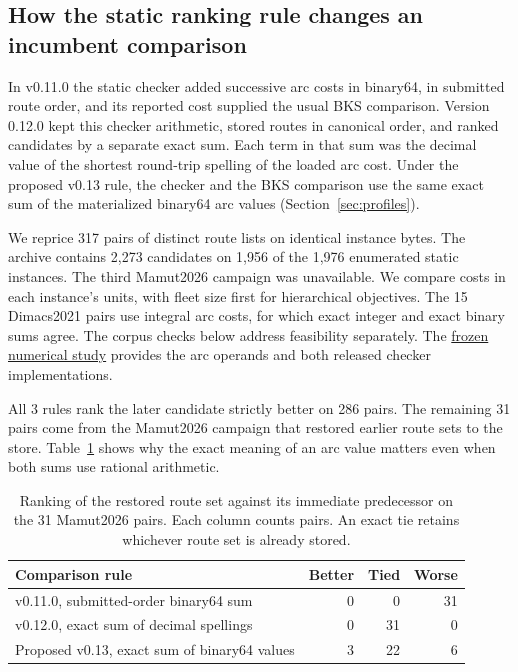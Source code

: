\subsection{How the static ranking rule changes an incumbent comparison}\label{app:static-history}

In v0.11.0 the static checker added successive arc costs in binary64, in submitted route order, and its reported cost supplied the usual BKS comparison. Version 0.12.0 kept this checker arithmetic, stored routes in canonical order, and ranked candidates by a separate exact sum. Each term in that sum was the decimal value of the shortest round-trip spelling of the loaded arc cost. Under the proposed v0.13 rule, the checker and the BKS comparison use the same exact sum of the materialized binary64 arc values (Section~\ref{sec:profiles}).

We reprice 317 pairs of distinct route lists on identical instance bytes. The archive contains 2,273 candidates on 1,956 of the 1,976 enumerated static instances. The third Mamut2026 campaign was unavailable. We compare costs in each instance's units, with fleet size first for hierarchical objectives. The 15 Dimacs2021 pairs use integral arc costs, for which exact integer and exact binary sums agree. The corpus checks below address feasibility separately. The \href{https://github.com/0nyr/routing-numerical-contracts/tree/75905c8827f959621ea808894e28136d248d2d15}{frozen numerical study} provides the arc operands and both released checker implementations.

All 3 rules rank the later candidate strictly better on 286 pairs. The remaining 31 pairs come from the Mamut2026 campaign that restored earlier route sets to the store. Table~\ref{tab:static-history} shows why the exact meaning of an arc value matters even when both sums use rational arithmetic.

\begin{table}[htbp]
\centering
\small
\begin{tabular}{@{}lrrr@{}}
\toprule
Comparison rule & Better & Tied & Worse\\
\midrule
v0.11.0, submitted-order binary64 sum & 0 & 0 & 31\\
v0.12.0, exact sum of decimal spellings & 0 & 31 & 0\\
Proposed v0.13, exact sum of binary64 values & 3 & 22 & 6\\
\bottomrule
\end{tabular}
\caption{Ranking of the restored route set against its immediate predecessor on the 31 Mamut2026 pairs. Each column counts pairs. An exact tie retains whichever route set is already stored.}\label{tab:static-history}
\end{table}

